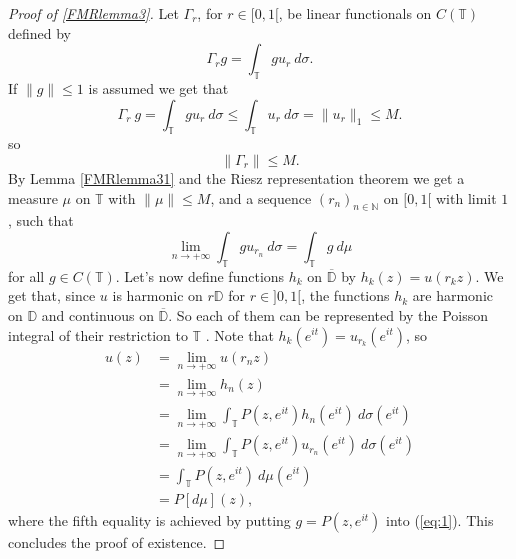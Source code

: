 \documentclass[a4paper,12pt,twoside,BCOR=10mm]{scrbook}
\theoremstyle{definition}
\theoremstyle{definition}
\theoremstyle{definition}
\begin{document}
\begin{proof}[Proof of \ref{FMRlemma3}]
Let $\Gamma_r$, for $r \in [0, 1[$, be linear functionals on $C(\mathbb{T})$ defined by
\[
	\Gamma_r g = \int_{\mathbb{T}} gu_r\ d\sigma.
\]
If $\|g\| \leq 1$ is assumed we get that
\[
\Gamma_r\ g = \int_{\mathbb{T}} gu_r\ d\sigma \leq \int_{\mathbb{T}} u_r\ d\sigma = \|u_r\|_1 \leq M.
\]
so
\[
	\|\Gamma_r\| \leq M.
\]
By Lemma \ref{FMRlemma31} and the Riesz representation theorem we get a measure $\mu$ on $\mathbb{T}$ with $\|\mu\| \leq M$, and a sequence $(r_n)_{n \in \mathbb{N}}$ on $[0, 1[$ with limit $1$, such that
\begin{equation}
	\label{eq:1}
	\lim_{n \rightarrow +\infty} \int_{\mathbb{T}} gu_{r_n}\ d\sigma = \int_{\mathbb{T}}g\ d\mu
\end{equation}
for all $g \in C(\mathbb{T})$.
Let's now define functions $h_k$ on $\overline{\mathbb{D}}$ by $h_k(z) = u(r_kz)$.
We get that, since $u$ is harmonic on $r\mathbb{D}$ for $r \in ]0, 1[$, the functions $h_k$ are harmonic on $\mathbb{D}$ and continuous on $\overline{\mathbb{D}}$.
So each of them can be represented by the Poisson integral of their restriction to $\mathbb{T}$ \citep[Theroem $11.9$]{rudin2}.
Note that $h_k(e^{it}) = u_{r_k}(e^{it})$, so
\begin{align*}
	u(z)
	&= \lim_{n \rightarrow +\infty} u(r_nz)\\
	&= \lim_{n \rightarrow +\infty} h_n(z)\\
	&= \lim_{n \rightarrow +\infty} \int_{\mathbb{T}}P(z, e^{it}) h_n(e^{it})\ d\sigma(e^{it})\\
	&= \lim_{n \rightarrow +\infty} \int_{\mathbb{T}}P(z, e^{it}) u_{r_n}(e^{it})\ d\sigma(e^{it})\\
	&= \int_{\mathbb{T}}P(z, e^{it})\ d\mu(e^{it})\\
	&= P[d\mu](z),
\end{align*}
where the fifth equality is achieved by putting $g = P(z, e^{it})$ into (\ref{eq:1}).
This concludes the proof of existence.


\end{proof}
\end{document}

